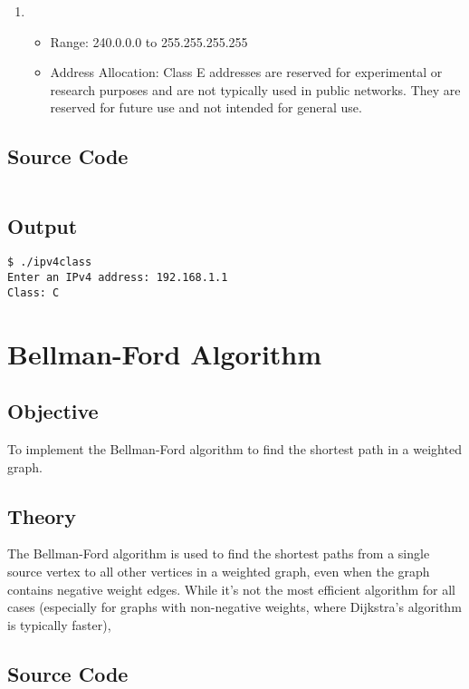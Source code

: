 \documentclass{korigamik}
\begin{document}
\begin{enumerate}[label=\textbf{Class \Alph*:}, leftmargin=2cm]
	\item \begin{itemize}
		      \item Range: 240.0.0.0 to 255.255.255.255
		      \item Address Allocation: Class E addresses are reserved for experimental or research purposes and are not typically used in public networks. They are reserved for future use and not intended for general use.
	      \end{itemize}
\end{enumerate}


\subsection*{Source Code}
\inputminted[firstline=5, lastline=25]{cpp}{code/ipv4class.cpp}
\subsection*{Output}
\begin{lstlisting}[style=output]
$ ./ipv4class
Enter an IPv4 address: 192.168.1.1
Class: C
\end{lstlisting}

\section{Bellman-Ford Algorithm}
\label{sec:Bellman-Ford Algorithm}

\subsection{Objective}
To implement the Bellman-Ford algorithm to find the shortest path
in a weighted graph.

\subsection{Theory}
The Bellman-Ford algorithm is used to find the shortest paths from a 
single source vertex to all other vertices in a weighted graph, even when the
graph contains negative weight edges. While it's not the most efficient
algorithm for all cases (especially for graphs with non-negative weights, where
Dijkstra's algorithm is typically faster),

\subsection{Source Code}
\inputminted[firstline=5, lastline=54]{cpp}{code/bellmanford.cpp}
\end{document}
